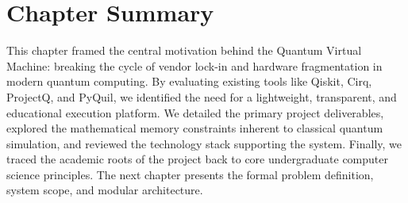 \section{Chapter Summary}

This chapter framed the central motivation behind the Quantum Virtual Machine: breaking the cycle of vendor lock-in and hardware fragmentation in modern quantum computing. By evaluating existing tools like Qiskit, Cirq, ProjectQ, and PyQuil, we identified the need for a lightweight, transparent, and educational execution platform. We detailed the primary project deliverables, explored the mathematical memory constraints inherent to classical quantum simulation, and reviewed the technology stack supporting the system. Finally, we traced the academic roots of the project back to core undergraduate computer science principles. The next chapter presents the formal problem definition, system scope, and modular architecture.
